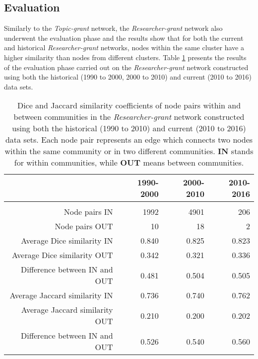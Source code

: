 \subsection{Evaluation}

Similarly to the \textit{Topic-grant} network, the \textit{Researcher-grant} network also underwent the evaluation phase and the results show that for both the current and historical \textit{Researcher-grant} networks, nodes within the same cluster have a higher similarity than nodes from different clusters. Table \ref{table:researcher_b_evaluation} presents the results of the evaluation phase carried out on the \textit{Researcher-grant} network constructed using both the historical (1990 to 2000, 2000 to 2010) and  current (2010 to 2016) data sets.

\begin{table}[htpb]
\centering
\caption[Dice and Jaccard similarity coefficients of node pairs within and between communities in the \textit{Researcher-grant} network constructed using both the historical (1990 to 2010) and current (2010 to 2016) data sets]{Dice and Jaccard similarity coefficients of node pairs within and between communities in the \textit{Researcher-grant} network constructed using both the historical (1990 to 2010) and current (2010 to 2016) data sets. Each node pair represents an edge which connects two nodes within the same community or in two different communities. \textbf{IN} stands for within communities, while \textbf{OUT} means between communities.}
\label{table:researcher_b_evaluation}
\begin{tabular}{r|rrr}
{} & \textbf{1990-2000} & \textbf{2000-2010} & \textbf{2010-2016}\\
\hline\\
Node pairs IN                  & {1992}  & {4901}  & {206}\\
Node pairs OUT                 & {10}    & {18}    & {2}\\
Average Dice similarity IN     & {0.840} & {0.825} & {0.823}\\
Average Dice similarity OUT    & {0.342} & {0.321} & {0.336}\\
Difference between IN and OUT  & {0.481} & {0.504} & {0.505}\\
Average Jaccard similarity IN  & {0.736} & {0.740} & {0.762}\\
Average Jaccard similarity OUT & {0.210} & {0.200} & {0.202}\\
Difference between IN and OUT  & {0.526} & {0.540} & {0.560}\\
\end{tabular}
\end{table}

